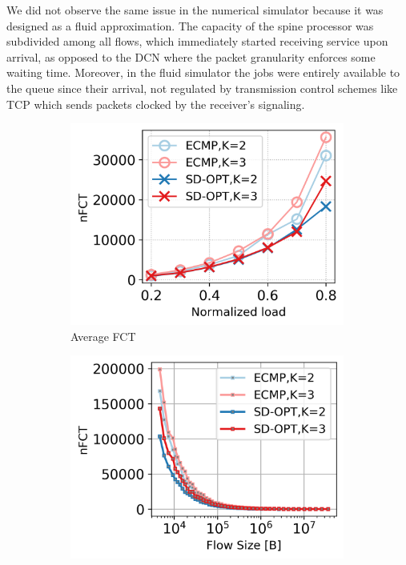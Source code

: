 We did not observe the same issue in the numerical simulator because it was designed as a fluid approximation. The capacity of the spine processor was subdivided among all flows, which immediately started receiving service upon arrival, as opposed to the DCN where the packet granularity enforces some waiting time. Moreover, in the fluid simulator the jobs were entirely available to the queue since their arrival, not regulated by transmission control schemes like TCP which sends packets clocked by the receiver's signaling.\\
\begin{figure}[!tb]
	\centering
	\begin{subfigure}{.33\textwidth}
		\centering
		\includegraphics[width=0.99\textwidth]{Chapter4/Figures/optimal_lb_thresh_K_2_3_udp}
		\vspace{1.4pt}
		\caption{Average FCT}
		\label{fig:opt-vs-ecmp-fct-udp}
	\end{subfigure}%
	\hfill
	\begin{subfigure}{.33\textwidth}
		\centering
		\includegraphics[width=0.99\textwidth]{Chapter4/Figures/optimal_lb_thresh_K_2_3_detailed_udp}

\end{subfigure}
\end{figure}
